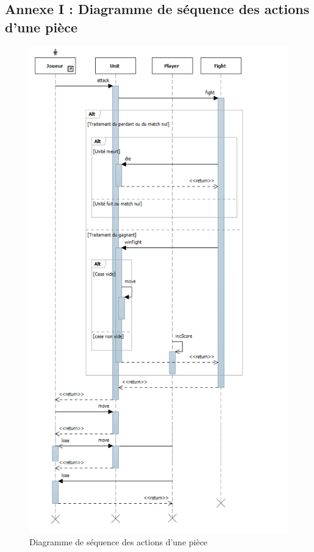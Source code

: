 \subsection{Annexe I : Diagramme de séquence des actions d'une pièce}
\begin{figure}[!h]
\centering
\includegraphics[width=1\textwidth]{img/Actions.png}
\caption{Diagramme de séquence des actions d'une pièce}
\end{figure}
\clearpage

